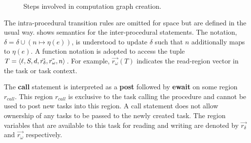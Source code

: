 \begin{figure}
\begin{center}
  \caption{Steps involved in computation graph creation.}
   \label{fig:cgcreation}
   \end{center}
\end{figure}

The intra-procedural transition rules are omitted for space but are defined in the usual way.  shows semantics for the inter-procedural statements. The notation, $\delta = \delta \cup (n \mapsto \eta(e))$, is understood to update $\delta$ such that $n$ additionally maps to $\eta(e)$. A function notation is adopted to access the tuple $T = \langle \ell,  S, d, \vec{r_\delta}, \vec{r_\omega}, n \rangle $. For example, $\vec{r_\omega}(T)$ indicates the read-region vector in the task or task context.

The \textbf{call} statement is interpreted as a \textbf{post} followed by \textbf{ewait} on some region $r_{call}$. This region $r_{call}$ is exclusive to the task calling the procedure and cannot be used to post new tasks into this region. A call statement does not allow ownership of any tasks to be passed to the newly created task. The region variables that are available to this task for reading and writing are denoted by $\vec{r_\delta}$ and $\vec{r_\omega}$ respectively.

